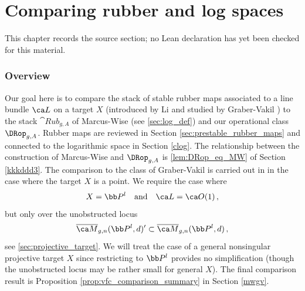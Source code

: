 \chapter{Comparing rubber and log spaces}
\label{pixtons-formula-abel-jacobi-picard-stack-chapter-07}

\begin{remark}
\label{pixtons-formula-abel-jacobi-picard-stack-chapter-07-source}
This chapter records the source section; no Lean declaration has yet been checked for this material.
\notready
\end{remark}

\label{sec:comparing_stacks}

\subsection{Overview}
Our goal here is to compare the stack of stable rubber maps
associated to a line bundle $\ca L$ on a target $X$   (introduced by Li \cite{Li2002A-degeneration} and studied by Graber-Vakil \cite{Graber2005Relative-virtua}) to
the stack $\cat{Rub}_{g,A}$ of Marcus-Wise (see \cref{sec:log_def}) and our operational class $\DRop_{g,A}$.
Rubber maps are reviewed in Section \ref{sec:prestable_rubber_maps} and connected to
the logarithmic space in Section \ref{clog}.
The relationship between  the construction
of Marcus-Wise and $\DRop_{g,A}$ is
 \cref{lem:DRop_eq_MW} of Section \ref{kkkddd3}. The comparison to the class of Graber-Vakil is carried out in \cite{Marcus2017Logarithmic-com} in the case where the target $X$ is a point. We require the case where
$$X = \bb P^\kk  \ \ \ \text{and}\ \ \  \ca L = \ca O(1)\, ,$$
but only over the unobstructed locus
$$\Mbar_{g,n}(\bb P^l, d)' \subset \Mbar_{g,n}(\bb P^l, d)\, ,$$
see \cref{sec:projective_target}.
We will treat the case of a general nonsingular
projective target $X$ since restricting to $\bb P^\kk$ provides no simplification (though the unobstructed locus may be rather small for general $X$).
The final comparison result is Proposition \ref{prop:vfc_comparison_summary} in Section \ref{mwgv}.


